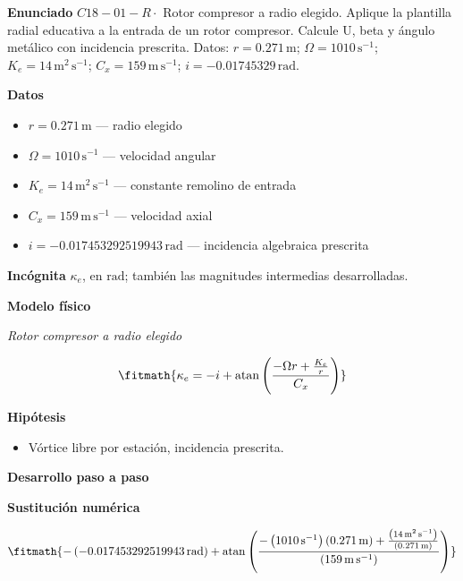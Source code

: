 \documentclass[10pt,openany]{book}
\begin{document}
\begin{tcolorbox}[title={Problema resuelto 1}, studiumworked, breakable]

\noindent\textbf{Enunciado}
\(C18-01-R \cdot\) Rotor compresor a radio elegido. Aplique la plantilla radial educativa a la entrada de un rotor compresor. Calcule U, beta y ángulo metálico con incidencia prescrita. Datos: \(r=0.271\, \mathrm{m}\); \(\Omega=1010\, \mathrm{s}^{-1}\); \(K_e=14\, \mathrm{m}^{2}\,\mathrm{s}^{-1}\); \(C_x=159\, \mathrm{m}\,\mathrm{s}^{-1}\); \(i=-0.01745329\, \mathrm{rad}\).

\noindent\textbf{Datos}
\begin{itemize}
\item $r = 0.271\,\mathrm{m}$ — radio elegido
\item $\Omega = 1010\,\mathrm{s}^{-1}$ — velocidad angular
\item $K_e = 14\,\mathrm{m}^{2}\,\mathrm{s}^{-1}$ — constante remolino de entrada
\item $C_x = 159\,\mathrm{m}\,\mathrm{s}^{-1}$ — velocidad axial
\item $i = -0.017453292519943\,\mathrm{rad}$ — incidencia algebraica prescrita
\end{itemize}

\noindent\textbf{Incógnita}
$\kappa_e$, en $\mathrm{rad}$; también las magnitudes intermedias desarrolladas.

\noindent\textbf{Modelo físico}

\noindent\textit{Rotor compresor a radio elegido}

\[
\fitmath{\kappa_e=- i + \operatorname{atan}{\left(\frac{- \Omega r + \frac{K_e}{r}}{C_x} \right)}}
\]

\noindent\textbf{Hipótesis}
\begin{itemize}
\item Vórtice libre por estación, incidencia prescrita.
\end{itemize}

\noindent\textbf{Desarrollo paso a paso}



\noindent\textbf{Sustitución numérica}

\[
\fitmath{- \left(-0.017453292519943\,\mathrm{rad}\right) + \operatorname{atan}{\left(\frac{- \left(1010\,\mathrm{s}^{-1}\right) \left(0.271\,\mathrm{m}\right) + \frac{\left(14\,\mathrm{m}^{2}\,\mathrm{s}^{-1}\right)}{\left(0.271\,\mathrm{m}\right)}}{\left(159\,\mathrm{m}\,\mathrm{s}^{-1}\right)} \right)}}
\]


\end{tcolorbox}
\end{document}
